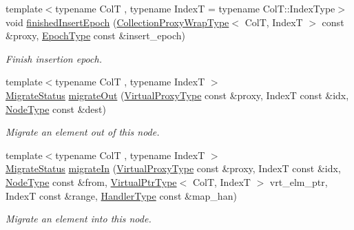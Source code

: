 \begin{DoxyCompactItemize}
{\footnotesize template$<$typename ColT , typename IndexT  = typename Col\+T\+::\+Index\+Type$>$ }\\void \hyperlink{structvt_1_1vrt_1_1collection_1_1_collection_manager_ac59dd2227839839776c92ca0c23934e5}{finished\+Insert\+Epoch} (\hyperlink{structvt_1_1vrt_1_1collection_1_1_collection_manager_a56458ed7f9bb22b631b9b3a745f42f94}{Collection\+Proxy\+Wrap\+Type}$<$ ColT, IndexT $>$ const \&proxy, \hyperlink{namespacevt_a985a5adf291c34a3ca263b3378388236}{Epoch\+Type} const \&insert\+\_\+epoch)
\begin{DoxyCompactList}\small\item\em Finish insertion epoch. \end{DoxyCompactList}\item 
{\footnotesize template$<$typename ColT , typename IndexT $>$ }\\\hyperlink{namespacevt_1_1vrt_1_1collection_ad221ad8aea9e586689b4335f5bcd9804}{Migrate\+Status} \hyperlink{structvt_1_1vrt_1_1collection_1_1_collection_manager_a480360a498a18520cbe2405ebbe7e9b6}{migrate\+Out} (\hyperlink{namespacevt_a1b417dd5d684f045bb58a0ede70045ac}{Virtual\+Proxy\+Type} const \&proxy, IndexT const \&idx, \hyperlink{namespacevt_a866da9d0efc19c0a1ce79e9e492f47e2}{Node\+Type} const \&dest)
\begin{DoxyCompactList}\small\item\em Migrate an element out of this node. \end{DoxyCompactList}\item 
{\footnotesize template$<$typename ColT , typename IndexT $>$ }\\\hyperlink{namespacevt_1_1vrt_1_1collection_ad221ad8aea9e586689b4335f5bcd9804}{Migrate\+Status} \hyperlink{structvt_1_1vrt_1_1collection_1_1_collection_manager_afb1aad3179facb178c032b6ae14d592a}{migrate\+In} (\hyperlink{namespacevt_a1b417dd5d684f045bb58a0ede70045ac}{Virtual\+Proxy\+Type} const \&proxy, IndexT const \&idx, \hyperlink{namespacevt_a866da9d0efc19c0a1ce79e9e492f47e2}{Node\+Type} const \&from, \hyperlink{structvt_1_1vrt_1_1collection_1_1_collection_manager_a1da9015e52d6ecca955f57b59aab0b82}{Virtual\+Ptr\+Type}$<$ ColT, IndexT $>$ vrt\+\_\+elm\+\_\+ptr, IndexT const \&range, \hyperlink{namespacevt_af64846b57dfcaf104da3ef6967917573}{Handler\+Type} const \&map\+\_\+han)
\begin{DoxyCompactList}\small\item\em Migrate an element into this node. \end{DoxyCompactList}\item 

\end{DoxyCompactItemize}
